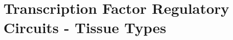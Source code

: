 
\newcommand{\hsp}{\hspace{20pt}}
\titleformat{\chapter}[hang]{\huge\bfseries}{\textcolor{chaptergrey}{\thechapter}\hsp\textcolor{chaptergrey}{|}\hsp}{0pt}{\large\bfseries}
\titlespacing{\chapter}{0pt}{-40pt}{30pt}

\chapter{Transcription Factor Regulatory Circuits - Tissue Types} 
\label{appendix:marbach}

